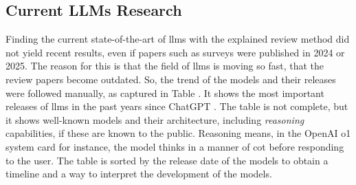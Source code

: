 \subsection{Current LLMs Research}

\hspace{1.5em} Finding the current state-of-the-art of \ac{llms} with the explained review method did not yield recent results, even if papers such as surveys were published in 2024 or 2025. The reason for this is that the field of \ac{llms} is moving so fast, that the review papers become outdated. So, the trend of the models and their releases were followed manually, as captured in Table . It shows the most important releases of \ac{llms} in the past years since ChatGPT \cite{openai_introducing_2022}. The table is not complete, but it shows well-known models and their architecture, including \textit{reasoning} capabilities, if these are known to the public. Reasoning means, in the OpenAI o1 system card \cite{openai_openai_2024-1} for instance, the model thinks in a manner of \ac{cot} before responding to the user. The table is sorted by the release date of the models to obtain a timeline and a way to interpret the development of the models.

\pagebreak

